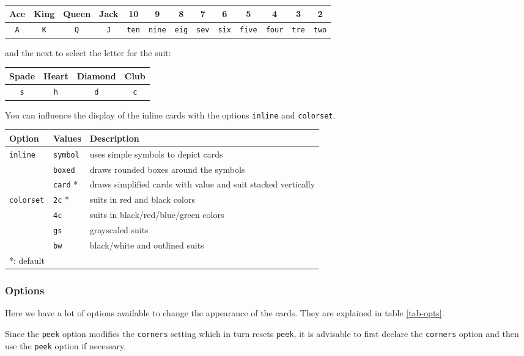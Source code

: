 \documentclass[11pt,english,BCOR10mm,DIV12,bibliography=totoc,parskip=false,smallheadings,
    headexclude,footexclude,oneside]{pst-doc}
\begin{document}
\small
\bigskip
\begin{tabular}{c|c|c|c|c|c|c|c|c|c|c|c|c}
Ace & King & Queen & Jack & 10 & 9 & 8 & 7 & 6 & 5 & 4 & 3 & 2\\\hline
\texttt{A} & \texttt{K} & \texttt{Q} & \texttt{J} & \texttt{ten} & \texttt{nine} & \texttt{eig} & \texttt{sev} & \texttt{six} & \texttt{five} & \texttt{four} & \texttt{tre} & \texttt{two}\\
\end{tabular}

\normalsize
and the next to select the letter for the suit:

\bigskip
\begin{tabular}{c|c|c|c}
Spade & Heart & Diamond & Club\\\hline
\texttt{s} & \texttt{h} & \texttt{d} & \texttt{c}\\
\end{tabular}

You can influence the display of the inline cards with the options \texttt{inline} and \texttt{colorset}.

\begin{tabular}{lll}
 Option & Values & Description \\\hline
\texttt{inline} & \texttt{symbol} & uses simple symbols to depict cards\\
& \texttt{boxed} & draws rounded boxes around the symbols\\
& \texttt{card} * & draws simplified cards with value and suit stacked vertically\\\hline
\texttt{colorset} & \texttt{2c} * & suits in red and black colors\\
& \texttt{4c} & suits in black/red/blue/green colors\\
& \texttt{gs} & grayscaled suits\\
& \texttt{bw} & black/white and outlined suits\\\hline
*: default\\
\end{tabular}


\subsubsection{Options}
Here we have a lot of options available to change the appearance of the cards. They are explained in table \ref{tab-opts}.

Since the \texttt{peek} option modifies the \texttt{corners} setting which in turn resets \texttt{peek}, it is advisable to first declare the \texttt{corners} option and then use the \texttt{peek} option if necessary.
\end{document}
